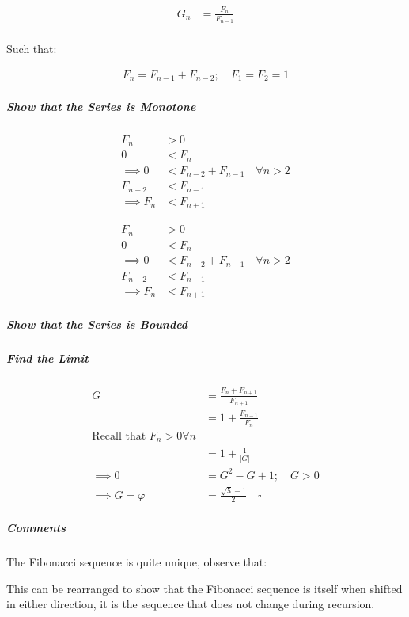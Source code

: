 \documentclass[11pt]{article}
\begin{document}
$$\begin{aligned}
G_n &= \frac{F_{n} }{F_{n - 1} } \\
\end{aligned}$$

Such that:

$$\begin{aligned}
F_n = F_{n- 1} +  F_{n- 2} ; \quad F_1 = F_2 = 1
\end{aligned}$$


\subparagraph{Show that the Series is Monotone}
\label{sec:orgdb9c6a2}
$$\begin{aligned}
F_{n} &> 0 \\
0 &< F_{n} \\
 \implies   0 &< F_{n - 2} +  F_{n- 1} \quad \forall n > 2 \\
  F_{n- 2} &< F_{n- 1}  \\
   \implies  F_n & < F_{n+1}
\end{aligned}$$

$$\begin{aligned}
F_{n} &> 0 \\
0 &< F_{n} \\
 \implies   0 &< F_{n - 2} +  F_{n- 1} \quad \forall n > 2 \\
  F_{n- 2} &< F_{n- 1}  \\
   \implies  F_n & < F_{n+1}
\end{aligned}$$



\subparagraph{Show that the Series is Bounded}
\label{sec:org4918aba}
\subparagraph{Find the Limit}
\label{sec:orgaff7eb0}
$$\begin{aligned}
G &= \frac{F_{n} +  F_{n+  1} }{F_{n+  1} } \\
&= 1 +  \frac{F_{n- 1} }{F_n} \\
\text{Recall that $F_n > 0 \forall n$}\\
&=  1 +  \frac{1}{    \left\lvert G \right\rvert } \\
 \implies  0 &= G^2- G +  1; \quad G > 0  \\
  \implies  G = \varphi &=  \frac{\sqrt{5} - 1  }{2} \quad  \square
\end{aligned}$$


\subparagraph{Comments}
\label{sec:org74a876c}

The Fibonacci sequence is quite unique, observe that:

This can be rearranged to show that the Fibonacci sequence is itself
when shifted in either direction, it is the sequence that does not
change during recursion.
\end{document}
